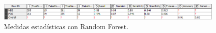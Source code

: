 \begin{figure}[H]
    \center\includegraphics[width=.95\linewidth]{img/classification/scoresRF.png}
    \caption{Medidas estadísticas con Random Forest.}
\end{figure}
